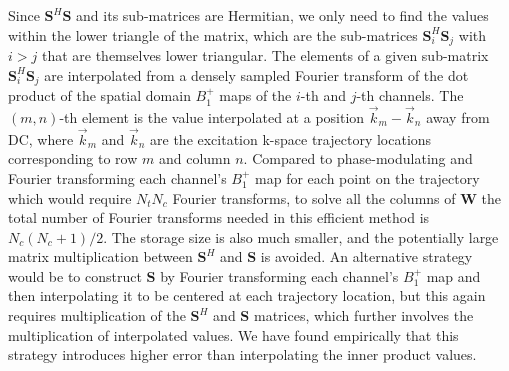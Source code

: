 \par Since $\bm{S}^{H}\bm{S}$ and its sub-matrices are Hermitian, 
we only need to find the values within the lower triangle of the matrix, 
which are the sub-matrices $\bm{S}_i^{H}\bm{S}_j$ with $i>j$ that are themselves lower triangular. 
The elements of a given sub-matrix $\bm{S}_i^{H}\bm{S}_j$ 
are interpolated from a densely sampled Fourier transform of the dot product of the spatial domain $B_1^+$ maps of the $i$-th and $j$-th channels. 
The $(m,n)$-th element is the value interpolated at a position $\vec{k}_m-\vec{k}_n$ away from DC,
where $\vec{k}_m$ and $\vec{k}_n$ are the excitation k-space trajectory locations corresponding to row $m$ and column $n$.
Compared to phase-modulating and Fourier transforming each channel's $B_1^+$ map for each point 
on the trajectory which would require $N_t  N_c$ Fourier transforms,
to solve all the columns of $\bm{W}$ the total number of Fourier transforms needed in this efficient method is $N_c(N_c+1)/2$. 
The storage size is also much smaller, 
and the potentially large matrix multiplication between $\bm{S}^H$ and $\bm{S}$ is avoided.
An alternative strategy would be to construct $\bm{S}$ by Fourier transforming each channel's $B_1^+$ map 
and then interpolating it to be centered at each trajectory location, 
but this again requires multiplication of the $\bm{S}^{H}$ and $\bm{S}$ matrices,
which further involves the multiplication of interpolated values. 
We have found empirically that this strategy introduces higher error
than interpolating the inner product values. 

